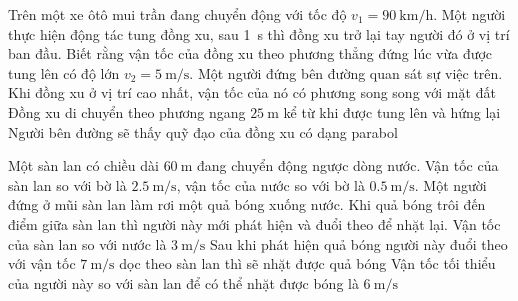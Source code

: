 \begin{ex}
	Trên một xe ôtô mui trần đang chuyển động với tốc độ $v_1 = \SI{90}{\kilo\metre/\hour}$. Một người thực hiện động tác tung đồng xu, sau \SI{1}{\second} thì đồng xu trở lại tay người đó ở vị trí ban đầu. Biết rằng vận tốc của đồng xu theo phương thẳng đứng lúc vừa được tung lên có độ lớn $v_2 = \SI{5}{\metre/\second}$. Một người đứng bên đường quan sát sự việc trên.
	{\True Khi đồng xu ở vị trí cao nhất, vận tốc của nó có phương song song với mặt đất}
	{\True Đồng xu di chuyển theo phương ngang $\SI{25}{\metre}$ kể từ khi được tung lên và hứng lại}
	{\True Người bên đường sẽ thấy quỹ đạo của đồng xu có dạng parabol}
\end{ex}
\begin{ex}
	Một sàn lan có chiều dài $\SI{60}{\metre}$ đang chuyển động ngược dòng nước. Vận tốc của sàn lan so với bờ là $\SI{2.5}{\metre/\second}$, vận tốc của nước so với bờ là $\SI{0.5}{\metre/\second}$. Một người đứng ở mũi sàn lan làm rơi một quả bóng xuống nước. Khi quả bóng trôi đến điểm giữa sàn lan thì người này mới phát hiện và đuổi theo để nhặt lại.
	{\True Vận tốc của sàn lan so với nước là $\SI{3}{\metre/\second}$}
	{\True Sau khi phát hiện quả bóng người này đuổi theo với vận tốc $\SI{7}{\metre/\second}$ dọc theo sàn lan thì sẽ nhặt được quả bóng}
	{\True Vận tốc tối thiểu của người này so với sàn lan để có thể nhặt được bóng là $\SI{6}{\metre/\second}$}
\end{ex}


